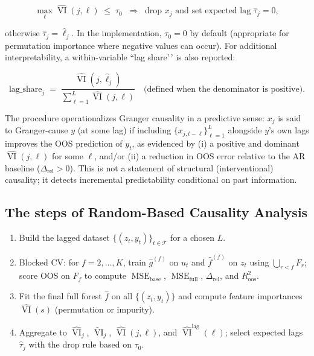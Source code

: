 \documentclass[preprint, 3p,
authoryear]{elsarticle} %
\begin{document}
\begin{equation}
\max_{\ell} \widehat{\operatorname{VI}}(j,\ell) \;\le\; \tau_0
\;\;\Longrightarrow\;\;
\text{drop } x_j \text{ and set expected lag } \widehat{\tau}_j=0,
\end{equation}

\noindent otherwise \(\widehat{\tau}_j=\widehat{\ell}_j\). In the
implementation, \(\tau_0=0\) by default (appropriate for permutation
importance where negative values can occur). For additional
interpretability, a within-variable ``lag share'\,' is also reported:

\begin{equation}
\text{lag\_share}_j
\;=\;
\frac{\widehat{\operatorname{VI}}(j,\widehat{\ell}_j)}
{\sum_{\ell=1}^L \widehat{\operatorname{VI}}(j,\ell)}
\quad \text{(defined when the denominator is positive)}.
\end{equation}

The procedure operationalizes Granger causality in a predictive sense:
\(x_j\) is said to Granger-cause \(y\) (at some lag) if including
\(\{x_{j,t-\ell}\}_{\ell=1}^L\) alongside \(y\)'s own lags improves the
OOS prediction of \(y_t\), as evidenced by (i) a positive and dominant
\(\widehat{\operatorname{VI}}(j,\ell)\) for some \(\ell\), and/or (ii) a
reduction in OOS error relative to the AR baseline
(\(\Delta_{\text{rel}}>0\)). This is not a statement of structural
(interventional) causality; it detects incremental predictability
conditional on past information.

\subsection*{The steps of Random-Based Causality Analysis}
\begin{enumerate}
\item Build the lagged dataset $\{(z_t,y_t)\}_{t\in\mathcal{T}}$ for a chosen $L$.
\item Blocked CV: for $f=2,\dots,K$, train $\widehat g^{(f)}$ on $u_t$ and $\widehat f^{(f)}$ on $z_t$ using $\bigcup_{r<f}F_r$; score OOS on $F_f$ to compute $\operatorname{MSE}_{\text{base}}$, $\operatorname{MSE}_{\text{full}}$, $\Delta_{\text{rel}}$, and $R^2_{\text{oos}}$.
\item Fit the final full forest $\widehat f$ on all $\{(z_t,y_t)\}$ and compute feature importances $\widehat{\operatorname{VI}}(s)$ (permutation or impurity).
\item Aggregate to $\widehat{\operatorname{VI}}_j$, $\widetilde{\operatorname{VI}}_j$, $\widehat{\operatorname{VI}}(j,\ell)$, and $\widehat{\operatorname{VI}}^{\text{lag}}(\ell)$; select expected lags $\widehat{\tau}_j$ with the drop rule based on $\tau_0$.
\end{enumerate}
\end{document}
